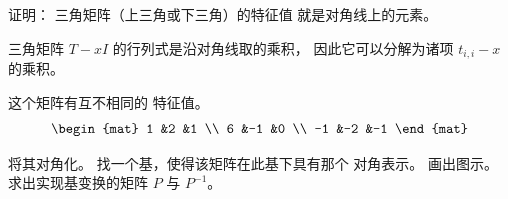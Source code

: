    \item 证明：
     三角矩阵（上三角或下三角）的特征值
     就是对角线上的元素。
     \begin{answer}
       三角矩阵 $T-xI$ 的行列式是沿对角线取的乘积，
       因此它可以分解为诸项 $t_{i,i}-x$ 的乘积。
     \end{answer}
   \recommended \item 这个矩阵有互不相同的
     特征值。
     \begin{equation*}
      \begin{mat}
       1  &2  &1 \\
       6  &-1 &0 \\
       -1 &-2 &-1
      \end{mat}
     \end{equation*}
     \begin{exparts}
       \partsitem 将其对角化。
       \partsitem 找一个基，使得该矩阵在此基下具有那个
         对角表示。
       \partsitem 画出图示。
          求出实现基变换的矩阵 $P$ 与 $P^{-1}$。
     \end{exparts}
